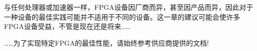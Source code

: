 与任何处理器或加速器一样，FPGA设备因厂商而异，甚至因产品而异，因此对于一种设备的最佳实践可能并不适用于不同的设备。这一章的建议可能会使许多FPGA设备受益，不管是现在还是将来……\par

\begin{tcolorbox}[colback=red!5!white,colframe=red!75!black]
……为了实现特定FPGA的最佳性能，请始终参考供应商提供的文档!
\end{tcolorbox}














